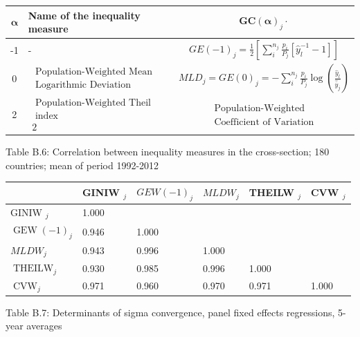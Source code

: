 \documentclass[10pt]{article}
\begin{document}
\begin{center}
\begin{tabular}{c|lc}
\hline
$\boldsymbol{\alpha}$ & Name of the inequality measure & $\boldsymbol{G} \boldsymbol{C}(\boldsymbol{\alpha})_{j} \cdot$ \\
\hline
-1 & - & $G E(-1)_{j}=\frac{1}{2}\left[\sum_{i}^{n_{j}} \frac{p_{i}}{P_{j}}\left[\widehat{y}_{l}^{-1}-1\right]\right]$ \\
0 & $\begin{array}{l}\text { Population-Weighted Mean } \\ \text { Logarithmic Deviation }\end{array}$ & $M L D_{j}=G E(0)_{j}=-\sum_{i}^{n_{j}} \frac{p_{i}}{P_{j}} \log \left(\frac{\widehat{y}_{l}}{\widehat{\bar{y}}_{j}}\right)$ \\
2 & $\begin{array}{l}\text { Population-Weighted Theil } \\ \text { index } \\ 2\end{array}$ & $\begin{array}{l}\text { Population-Weighted } \\ \text { Coefficient of Variation }\end{array}$ \\
\hline
\end{tabular}
\end{center}

Table B.6: Correlation between inequality measures in the cross-section; 180 countries; mean of period 1992-2012

\begin{center}
\begin{tabular}{llllll}
\hline
 & GINIW $_{j}$ & $G E W(-1)_{j}$ & $M L D W_{j}$ & THEILW $_{j}$ & CVW $_{j}$ \\
\hline
GINIW $_{j}$ & 1.000 &  &  &  &  \\
$\operatorname{GEW}(-1)_{j}$ & 0.946 & 1.000 &  &  &  \\
$M L D W_{j}$ & 0.943 & 0.996 & 1.000 &  &  \\
$\operatorname{THEILW}_{j}$ & 0.930 & 0.985 & 0.996 & 1.000 &  \\
$\operatorname{CVW}_{j}$ & 0.971 & 0.960 & 0.970 & 0.971 & 1.000 \\
\hline
\end{tabular}
\end{center}

Table B.7: Determinants of sigma convergence, panel fixed effects regressions, 5-year averages
\end{document}
